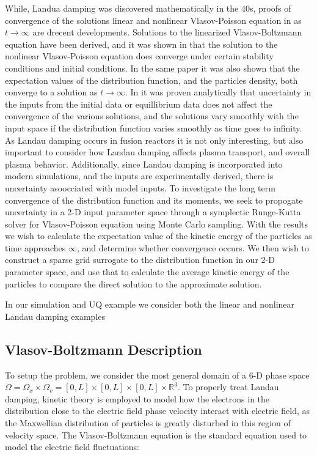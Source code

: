 \documentclass{article}
\begin{document}
\vspace{0.01cm}
While, Landua damping was discovered mathematically in the 40s, proofs of convergence of the solutions linear and nonlinear Vlasov-Poisson equation in as $t \to \infty$ are drecent developments. Solutions to the linearized Vlasov-Boltzmann equation have been derived, and it was shown in \cite{Vellani} that the solution to the nonlinear Vlasov-Poisson equation does converge under certain stability conditions and initial conditions. In the same paper it was also shown that the expectation values of the distribution function, and the particles density, both converge to a solution as $t \to \infty$. In \cite{DingJin} it was proven analytically that uncertainty in the inputs from the initial data or equillibrium data does not affect the convergence of the various solutions, and the solutions vary smoothly with the input space if the distribution function varies smoothly as time goes to infinity.\\

As Landau damping occurs in fusion reactors it is not only interesting, but also important to consider how Landau damping affects plasma transport, and overall plasma behavior. Additionally, since Landau damping is incorporated into modern simulations, and the inputs are experimentally derived, there is uncertainty asoocciated with model inputs. To investigate the long term convergence of the distribution function and its moments, we seek to propogate uncertainty in a 2-D input parameter space through a symplectic Runge-Kutta solver for Vlasov-Poisson equation using Monte Carlo sampling. With the results we wish to calculate the expectation value of the kinetic energy of the particles as time approaches $\infty$, and determine whether convergence occurs. We then wish to construct a sparse grid surrogate to the distribution function in our 2-D parameter space, and use that to calculate the average kinetic energy of the particles to compare the direct solution to the approximate solution.\\

\vspace{0.01cm}

In our simulation and UQ example we consider both the linear and nonlinear Landau damping examples\\ 

\vspace{0.01cm}
\subsection{Vlasov-Boltzmann Description}
To setup the problem, we consider the most general domain of a 6-D phase space $\Omega = \Omega_x\times \Omega_v = [0,L]\times[0,L]\times[0,L]\times \mathbb{R}^3$. To properly treat Landau damping, kinetic theory is employed to model how the electrons in the distribution close to the electric field phase velocity interact with electric field, as the Maxwellian distribution of particles is greatly disturbed in this region of velocity space.  The Vlasov-Boltzmann equation is the standard equation used to model the electric field fluctuations:
\end{document}

